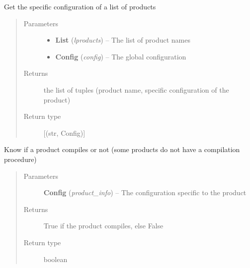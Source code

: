 \documentclass[a4paper,10pt,english]{sphinxmanual}
\begin{document}

\begin{fulllineitems}
\label{commands/apidoc/src:src.product.get_products_infos}
Get the specific configuration of a list of products
\begin{quote}\begin{description}
\item[{Parameters}] \leavevmode\begin{itemize}
\item {} 
\textbf{List} (\emph{lproducts}) -- The list of product names

\item {} 
\textbf{Config} (\emph{config}) -- The global configuration

\end{itemize}

\item[{Returns}] \leavevmode
the list of tuples 
(product name, specific configuration of the product)

\item[{Return type}] \leavevmode
{[}(str, Config){]}

\end{description}\end{quote}

\end{fulllineitems}


\begin{fulllineitems}
\label{commands/apidoc/src:src.product.product_compiles}
Know if a product compiles or not 
(some products do not have a compilation procedure)
\begin{quote}\begin{description}
\item[{Parameters}] \leavevmode
\textbf{Config} (\emph{product\_info}) -- The configuration specific to 
the product

\item[{Returns}] \leavevmode
True if the product compiles, else False

\item[{Return type}] \leavevmode
boolean

\end{description}\end{quote}

\end{fulllineitems}
\end{document}
